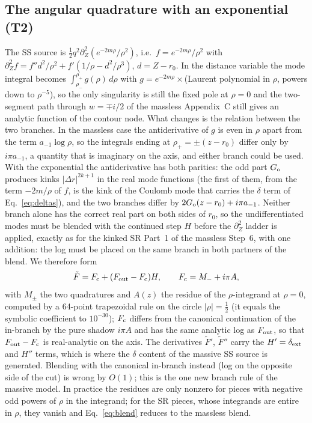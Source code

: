 \documentclass[11pt,a4paper]{article}
\newcommand{\dext}{\delta_{\rm ext}}
\begin{document}
\subsection{The angular quadrature with an exponential (T2)}\label{sec:ssmodes}
The SS source is $\tfrac12q^2\partial_Z^2(e^{-2m\rho}/\rho^2)$, i.e.\ $f=e^{-2m\rho}/\rho^2$ with $\partial_Z^2f=f''d^2/\rho^2+f'(1/\rho-d^2/\rho^3)$, $d=Z-r_0$.
In the distance variable the mode integral becomes $\int_{\rho_-}^{\rho_+}g(\rho)\,d\rho$ with $g=e^{-2m\rho}\times$(Laurent polynomial in $\rho$, powers down to $\rho^{-5}$), so the only singularity is still the fixed pole at $\rho=0$ and the two-segment path through $w=\mp i/2$ of the massless Appendix~C still gives an analytic function of the contour node.
What changes is the relation between the two branches.
In the massless case the antiderivative of $g$ is even in $\rho$ apart from the term $a_{-1}\log\rho$, so the integrals ending at $\rho_+=\pm(z-r_0)$ differ only by $i\pi a_{-1}$, a quantity that is imaginary on the axis, and either branch could be used.
With the exponential the antiderivative has both parities: the odd part $G_{\rm o}$ produces kinks $|\Delta r|^{2k+1}$ in the real mode functions (the first of them, from the term $-2m/\rho$ of $f$, is the kink of the Coulomb mode that carries the $\delta$ term of Eq.~\eqref{eq:deltas}), and the two branches differ by $2G_{\rm o}(z-r_0)+i\pi a_{-1}$.
Neither branch alone has the correct real part on both sides of $r_0$, so the undifferentiated modes must be blended with the continued step $H$ before the $\partial_Z^2$ ladder is applied, exactly as for the kinked SR Part~1 of the massless Step~6, with one addition: the log must be placed on the same branch in both partners of the blend.
We therefore form
\begin{equation}
\tilde F=F_{\rm c}+(F_{\rm out}-F_{\rm c})H,\qquad F_{\rm c}=M_-+i\pi A ,
\label{eq:blend}
\end{equation}
with $M_\pm$ the two quadratures and $A(z)$ the residue of the $\rho$-integrand at $\rho=0$, computed by a 64-point trapezoidal rule on the circle $|\rho|=\tfrac12$ (it equals the symbolic coefficient to $10^{-30}$); $F_{\rm c}$ differs from the canonical continuation of the in-branch by the pure shadow $i\pi A$ and has the same analytic log as $F_{\rm out}$, so that $F_{\rm out}-F_{\rm c}$ is real-analytic on the axis.
The derivatives $\tilde F'$, $\tilde F''$ carry the $H'=\dext$ and $H''$ terms, which is where the $\delta$ content of the massive SS source is generated.
Blending with the canonical in-branch instead (log on the opposite side of the cut) is wrong by $O(1)$; this is the one new branch rule of the massive model.
In practice the residues are only nonzero for pieces with negative odd powers of $\rho$ in the integrand; for the SR pieces, whose integrands are entire in $\rho$, they vanish and Eq.~\eqref{eq:blend} reduces to the massless blend.
\end{document}
